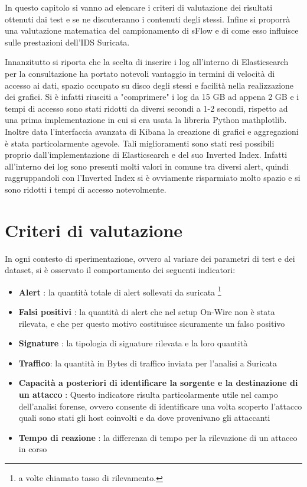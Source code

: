 \documentclass[12pt,a4paper,openright,twoside]{report}
\begin{document}
In questo capitolo si vanno ad elencare i criteri di valutazione dei risultati
ottenuti dai test e se ne discuteranno i contenuti degli stessi.
Infine si proporr\`a una valutazione matematica del campionamento di sFlow e di come
esso influisce sulle prestazioni dell'IDS Suricata.

Innanzitutto si riporta che la scelta di inserire i log all'interno di Elasticsearch
per la consultazione ha portato notevoli vantaggio in termini di velocit\`a di accesso
ai dati, spazio occupato su disco degli stessi e facilit\`a nella realizzazione dei grafici.
Si \`e infatti riusciti a "comprimere" i log da 15 GB ad appena 2 GB e i tempi di accesso
sono stati ridotti da diversi secondi a 1-2 secondi, rispetto ad una prima implementazione in cui si
era usata la libreria Python mathplotlib. Inoltre data l'interfaccia avanzata di Kibana
la creazione di grafici e aggregazioni \`e stata particolarmente agevole.
Tali miglioramenti sono stati resi possibili proprio dall'implementazione di Elasticsearch
e del suo Inverted Index. Infatti all'interno dei log sono presenti molti valori
 in comune tra diversi alert, quindi raggruppandoli con l'Inverted Index si
\`e ovviamente risparmiato molto spazio e si sono ridotti i tempi di accesso notevolmente.

\section{Criteri di valutazione}
In ogni contesto di sperimentazione, ovvero al variare dei parametri di test e dei
dataset, si \`e osservato il comportamento dei seguenti indicatori:
\begin{itemize}
  \item {\bf Alert} : la quantit\`a totale di alert sollevati da suricata \footnote{a volte chiamato tasso di rilevamento.}
  \item {\bf Falsi positivi} : la quantit\`a di alert che nel setup On-Wire
  non \`e stata rilevata, e che per questo motivo costituisce sicuramente un falso positivo
  \item {\bf Signature} : la tipologia di signature rilevata e la loro quantit\`a
  \item {\bf Traffico}: la quantit\`a in Bytes di traffico inviata per l'analisi
  a Suricata
  \item{\bf Capacit\`a a posteriori di identificare la sorgente e la destinazione di un
  attacco} : Questo indicatore risulta particolarmente utile nel campo dell'analisi forense,
  ovvero consente di identificare una volta scoperto l'attacco quali sono stati gli
  host coinvolti e da dove provenivano gli attaccanti
  \item {\bf Tempo di reazione} : la differenza di tempo per la rilevazione di
  un attacco in corso
\end{itemize}
\end{document}

